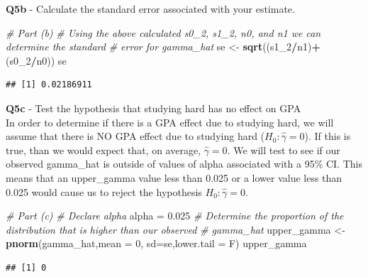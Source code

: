\documentclass[
]{article}
\newenvironment{Shaded}{\begin{snugshade}}{\end{snugshade}}
\newcommand{\AttributeTok}[1]{\textcolor[rgb]{0.13,0.29,0.53}{#1}}
\newcommand{\CommentTok}[1]{\textcolor[rgb]{0.56,0.35,0.01}{\textit{#1}}}
\newcommand{\DecValTok}[1]{\textcolor[rgb]{0.00,0.00,0.81}{#1}}
\newcommand{\FloatTok}[1]{\textcolor[rgb]{0.00,0.00,0.81}{#1}}
\newcommand{\FunctionTok}[1]{\textcolor[rgb]{0.13,0.29,0.53}{\textbf{#1}}}
\newcommand{\NormalTok}[1]{#1}
\newcommand{\OtherTok}[1]{\textcolor[rgb]{0.56,0.35,0.01}{#1}}
\newcommand{\SpecialCharTok}[1]{\textcolor[rgb]{0.81,0.36,0.00}{\textbf{#1}}}
\begin{document}
\hfill\break
\hfill\break

\textbf{Q5b} - Calculate the standard error associated with your
estimate.\\

\begin{Shaded}
\begin{Highlighting}[]
\CommentTok{\# Part (b)}
\CommentTok{\# Using the above calculated s0\_2, s1\_2, n0, and n1 we can determine the standard}
\CommentTok{\# error for gamma\_hat}
\NormalTok{se }\OtherTok{\textless{}{-}} \FunctionTok{sqrt}\NormalTok{((s1\_2}\SpecialCharTok{/}\NormalTok{n1)}\SpecialCharTok{+}\NormalTok{(s0\_2}\SpecialCharTok{/}\NormalTok{n0))}
\NormalTok{se}
\end{Highlighting}
\end{Shaded}

\begin{verbatim}
## [1] 0.02186911
\end{verbatim}

\hfill\break
\hfill\break

\textbf{Q5c} - Test the hypothesis that studying hard has no effect on
GPA\\
In order to determine if there is a GPA effect due to studying hard, we
will assume that there is NO GPA effect due to studying hard
(\(H_0: \hat{\gamma} = 0\)). If this is true, than we would expect that,
on average, \(\hat{\gamma} = 0\). We will test to see if our observed
gamma\_hat is outside of values of alpha associated with a 95\% CI. This
means that an upper\_gamma value less than 0.025 or a lower value less
than 0.025 would cause us to reject the hypothesis
\(H_0: \hat{\gamma} = 0\).\\

\begin{Shaded}
\begin{Highlighting}[]
\CommentTok{\# Part (c)}
\CommentTok{\# Declare alpha}
\NormalTok{alpha }\OtherTok{=} \FloatTok{0.025}
\CommentTok{\# Determine the proportion of the distribution that is higher than our observed}
\CommentTok{\# gamma\_hat}
\NormalTok{upper\_gamma }\OtherTok{\textless{}{-}} \FunctionTok{pnorm}\NormalTok{(gamma\_hat,}\AttributeTok{mean =} \DecValTok{0}\NormalTok{, }\AttributeTok{sd=}\NormalTok{se,}\AttributeTok{lower.tail =}\NormalTok{ F)}
\NormalTok{upper\_gamma}
\end{Highlighting}
\end{Shaded}

\begin{verbatim}
## [1] 0
\end{verbatim}
\end{document}
